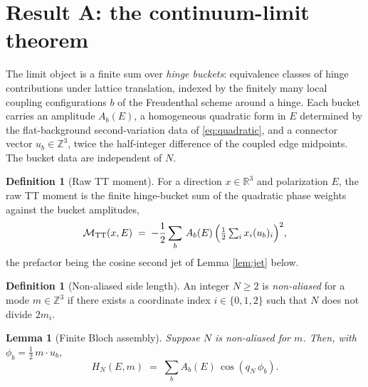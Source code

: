 \documentclass[11pt]{article}
\newtheorem{lemma}[theorem]{Lemma}
\theoremstyle{definition}
\newtheorem{definition}[theorem]{Definition}
\theoremstyle{remark}
\newcommand{\R}{\mathbb{R}}
\newcommand{\Z}{\mathbb{Z}}
\newcommand{\TT}{\mathrm{TT}}
\begin{document}
\section{Result A: the continuum-limit theorem}
\label{sec:limit}

The limit object is a finite sum over \emph{hinge buckets}: equivalence classes of hinge contributions under lattice translation, indexed by the finitely many local coupling configurations $b$ of the Freudenthal scheme around a hinge. Each bucket carries an amplitude $A_b(E)$, a homogeneous quadratic form in $E$ determined by the flat-background second-variation data of \eqref{eq:quadratic}, and a connector vector $u_b\in\Z^3$, twice the half-integer difference of the coupled edge midpoints. The bucket data are independent of $N$.

\begin{definition}[Raw TT moment]
\label{def:moment}
For a direction $x\in\R^3$ and polarization $E$, the raw TT moment is the finite hinge-bucket sum of the quadratic phase weights against the bucket amplitudes,
\begin{equation}
\mathcal{M}_{\TT}(x,E) \;=\; -\frac12\sum_{b}\, A_b(E)\,\Bigl(\tfrac12 \textstyle\sum_i x_i (u_b)_i\Bigr)^{2},
\label{eq:moment}
\end{equation}
the prefactor being the cosine second jet of Lemma \ref{lem:jet} below.
\end{definition}

\begin{definition}[Non-aliased side length]
\label{def:nonaliased}
An integer $N\ge 2$ is \emph{non-aliased} for a mode $m\in\Z^3$ if there exists a coordinate index $i\in\{0,1,2\}$ such that $N$ does not divide $2m_i$.
\end{definition}

\begin{lemma}[Finite Bloch assembly]
\label{lem:assembly}
Suppose $N$ is non-aliased for $m$. Then, with $\phi_b = \tfrac12\, m\cdot u_b$,
\begin{equation}
H_N(E,m) \;=\; \sum_{b} A_b(E)\,\cos(q_N\,\phi_b).
\label{eq:fold}
\end{equation}
\end{lemma}
\end{document}

